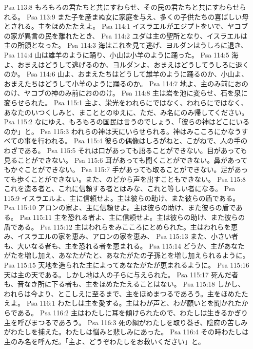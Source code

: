 Psa 113:8  もろもろの君たちと共にすわらせ、その民の君たちと共にすわらせられる。
Psa 113:9  また子を産まぬ女に家庭を与え、多くの子供たちの喜ばしい母とされる。主をほめたたえよ。
Psa 114:1  イスラエルがエジプトをいで、ヤコブの家が異言の民を離れたとき、
Psa 114:2  ユダは主の聖所となり、イスラエルは主の所領となった。
Psa 114:3  海はこれを見て逃げ、ヨルダンはうしろに退き、
Psa 114:4  山は雄羊のように踊り、小山は小羊のように踊った。
Psa 114:5  海よ、おまえはどうして逃げるのか、ヨルダンよ、おまえはどうしてうしろに退くのか。
Psa 114:6  山よ、おまえたちはどうして雄羊のように踊るのか、小山よ、おまえたちはどうして小羊のように踊るのか。
Psa 114:7  地よ、主のみ前におののけ、ヤコブの神のみ前におののけ。
Psa 114:8  主は岩を池に変らせ、石を泉に変らせられた。
Psa 115:1  主よ、栄光をわれらにではなく、われらにではなく、あなたのいつくしみと、まこととのゆえに、ただ、み名にのみ帰してください。
Psa 115:2  なにゆえ、もろもろの国民は言うのでしょう、「彼らの神はどこにいるのか」と。
Psa 115:3  われらの神は天にいらせられる。神はみこころにかなうすべての事を行われる。
Psa 115:4  彼らの偶像はしろがねと、こがねで、人の手のわざである。
Psa 115:5  それは口があっても語ることができない。目があっても見ることができない。
Psa 115:6  耳があっても聞くことができない。鼻があってもかぐことができない。
Psa 115:7  手があっても取ることができない。足があっても歩くことができない。また、のどから声を出すこともできない。
Psa 115:8  これを造る者と、これに信頼する者とはみな、これと等しい者になる。
Psa 115:9  イスラエルよ、主に信頼せよ。主は彼らの助け、また彼らの盾である。
Psa 115:10  アロンの家よ、主に信頼せよ。主は彼らの助け、また彼らの盾である。
Psa 115:11  主を恐れる者よ、主に信頼せよ。主は彼らの助け、また彼らの盾である。
Psa 115:12  主はわれらをみこころにとめられた。主はわれらを恵み、イスラエルの家を恵み、アロンの家を恵み、
Psa 115:13  また、小さい者も、大いなる者も、主を恐れる者を恵まれる。
Psa 115:14  どうか、主があなたがたを増し加え、あなたがたと、あなたがたの子孫とを増し加えられるように。
Psa 115:15  天地を造られた主によってあなたがたが恵まれるように。
Psa 115:16  天は主の天である。しかし地は人の子らに与えられた。
Psa 115:17  死んだ者も、音なき所に下る者も、主をほめたたえることはない。
Psa 115:18  しかし、われらは今より、とこしえに至るまで、主をほめまつるであろう。主をほめたたえよ。
Psa 116:1  わたしは主を愛する。主はわが声と、わが願いとを聞かれたからである。
Psa 116:2  主はわたしに耳を傾けられたので、わたしは生きるかぎり主を呼びまつるであろう。
Psa 116:3  死の綱がわたしを取り巻き、陰府の苦しみがわたしを捕えた。わたしは悩みと悲しみにあった。
Psa 116:4  その時わたしは主のみ名を呼んだ。「主よ、どうぞわたしをお救いください」と。
